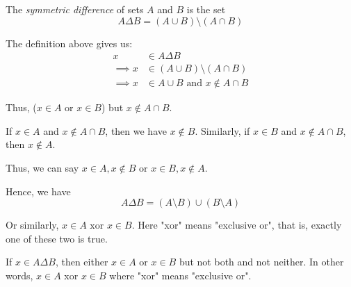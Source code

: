 \begin{definition}
	The \emph{symmetric difference} of sets $A$ and $B$ is the set
	$$A \Delta B = (A \cup B) \setminus (A \cap B)$$
\end{definition}
\begin{scratch}
	The definition above gives us:
	\begin{align*}
		x          & \in A \Delta B                               \\
		\implies x & \in (A \cup B) \setminus (A \cap B)          \\
		\implies x & \in A \cup B \text{ and } x \not\in A \cap B
	\end{align*}

	Thus, ($x \in A$ or $x \in B$) but $x \not\in A \cap B$.

	If $x \in A$ and $x \not\in A \cap B$, then we have $x \not\in B$.
	Similarly, if $x \in B$ and $x \not\in A \cap B$, then $x \not\in A$.

	Thus, we can say $x \in A, x  \not\in B$ or $x \in B, x \not\in A$.

	Hence, we have
	\begin{equation} \label{eq:2}
		A \Delta B = (A \setminus B) \cup (B \setminus A)
	\end{equation}

	Or similarly, $x \in A \text{ xor } x \in B$. Here "xor" means "exclusive or", that is, exactly one of these two is true.

	\begin{lemma}\label{lsd}
		If $x \in A \Delta B$, then either $x \in A$ or $x \in B$ but not both and not neither. In other words, $x \in A$ xor $x \in B$ where "xor" means "exclusive or".
	\end{lemma}

\end{scratch}

